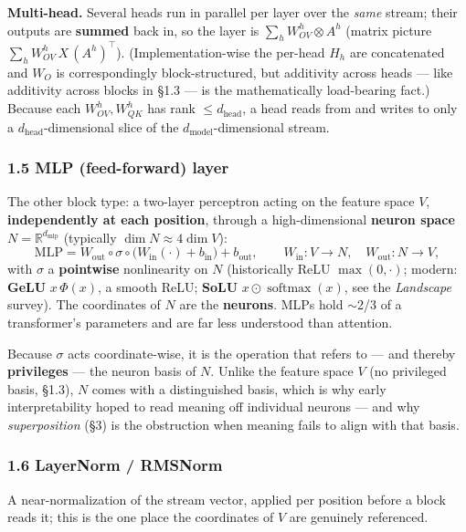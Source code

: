 \textbf{Multi-head.} Several heads run in parallel per layer over the \emph{same} stream; their outputs are \textbf{summed} back in, so the layer is $\sum_h W_{OV}^h\otimes A^h$ (matrix picture $\sum_h W_{OV}^h\, X\, (A^h)^\top$). (Implementation-wise the per-head $H_h$ are concatenated and $W_O$ is correspondingly block-structured, but additivity across heads --- like additivity across blocks in §1.3 --- is the mathematically load-bearing fact.) Because each $W_{OV}^h, W_{QK}^h$ has rank $\le d_{\text{head}}$, a head reads from and writes to only a $d_{\text{head}}$-dimensional slice of the $d_{\text{model}}$-dimensional stream.


\subsubsection*{1.5 MLP (feed-forward) layer}
The other block type: a two-layer perceptron acting on the feature space $V$, \textbf{independently at each position}, through a high-dimensional \textbf{neuron space} $N = \mathbb{R}^{d_{\text{mlp}}}$ (typically $\dim N \approx 4\dim V$): \[ \mathrm{MLP} = W_{\text{out}}\circ \sigma \circ \big(W_{\text{in}}(\cdot) + b_{\text{in}}\big) + b_{\text{out}}, \qquad W_{\text{in}} : V \to N,\quad W_{\text{out}} : N \to V, \] with $\sigma$ a \textbf{pointwise} nonlinearity on $N$ (historically ReLU $\max(0,\cdot)$; modern: \textbf{GeLU} $x\,\Phi(x)$, a smooth ReLU; \textbf{SoLU} $x \odot \operatorname{softmax}(x)$, see the \emph{Landscape} survey). The coordinates of $N$ are the \textbf{neurons}. MLPs hold $\sim$2/3 of a transformer's parameters and are far less understood than attention.


Because $\sigma$ acts coordinate-wise, it is the operation that refers to --- and thereby \textbf{privileges} --- the neuron basis of $N$. Unlike the feature space $V$ (no privileged basis, §1.3), $N$ comes with a distinguished basis, which is why early interpretability hoped to read meaning off individual neurons --- and why \emph{superposition} (§3) is the obstruction when meaning fails to align with that basis.


\subsubsection*{1.6 LayerNorm / RMSNorm}
A near-normalization of the stream vector, applied per position before a block reads it; this is the one place the coordinates of $V$ are genuinely referenced.

